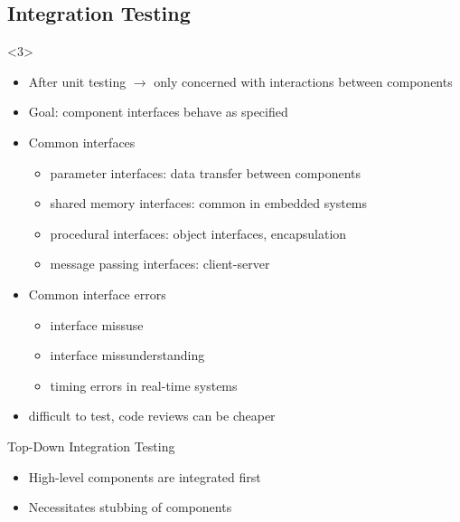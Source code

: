 
\subsection{Integration Testing}
\begin{frame}<3>{\insertsubsection}
	\slideStagesTesting
\end{frame}


\begin{frame}{\insertsubsection}
	\begin{fancycolumns}[animation=none]
		\begin{definition}{\insertsubsection {}}
			\begin{itemize}
				\item After unit testing $\rightarrow$ only concerned with interactions between components
				\item Goal: component interfaces behave as specified
				\item Common interfaces
				\begin{itemize}
					\item parameter interfaces: data transfer between components
					\item shared memory interfaces: common in embedded systems
					\item procedural interfaces: object interfaces, encapsulation
					\item message passing interfaces: client-server
				\end{itemize}
				\item Common interface errors
				\begin{itemize}
					\item interface missuse
					\item interface missunderstanding
					\item timing errors in real-time systems
				\end{itemize}
				\item difficult to test, code reviews can be cheaper
			\end{itemize}
		\end{definition}
		\pause
		\nextcolumn
		\begin{definition}{Top-Down Integration Testing}
			\begin{itemize}
				\item High-level components are integrated first
				\item Necessitates stubbing of components

\end{itemize}
\end{definition}
\end{fancycolumns}
\end{frame}
